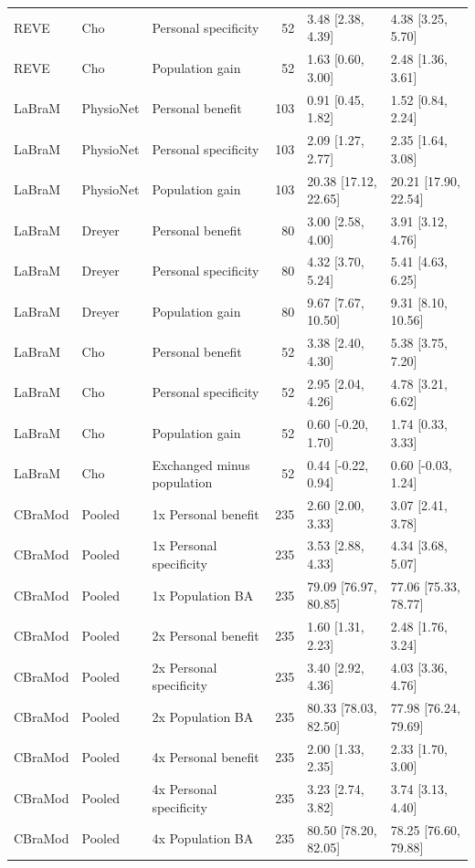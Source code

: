\begin{longtable}{p{.65in}p{.60in}p{1.9in}rp{1.20in}p{1.20in}}
REVE & Cho & Personal specificity & 52 & 3.48 [2.38, 4.39] & 4.38 [3.25, 5.70] \\
REVE & Cho & Population gain & 52 & 1.63 [0.60, 3.00] & 2.48 [1.36, 3.61] \\
LaBraM & PhysioNet & Personal benefit & 103 & 0.91 [0.45, 1.82] & 1.52 [0.84, 2.24] \\
LaBraM & PhysioNet & Personal specificity & 103 & 2.09 [1.27, 2.77] & 2.35 [1.64, 3.08] \\
LaBraM & PhysioNet & Population gain & 103 & 20.38 [17.12, 22.65] & 20.21 [17.90, 22.54] \\
LaBraM & Dreyer & Personal benefit & 80 & 3.00 [2.58, 4.00] & 3.91 [3.12, 4.76] \\
LaBraM & Dreyer & Personal specificity & 80 & 4.32 [3.70, 5.24] & 5.41 [4.63, 6.25] \\
LaBraM & Dreyer & Population gain & 80 & 9.67 [7.67, 10.50] & 9.31 [8.10, 10.56] \\
LaBraM & Cho & Personal benefit & 52 & 3.38 [2.40, 4.30] & 5.38 [3.75, 7.20] \\
LaBraM & Cho & Personal specificity & 52 & 2.95 [2.04, 4.26] & 4.78 [3.21, 6.62] \\
LaBraM & Cho & Population gain & 52 & 0.60 [-0.20, 1.70] & 1.74 [0.33, 3.33] \\
LaBraM & Cho & Exchanged minus population & 52 & 0.44 [-0.22, 0.94] & 0.60 [-0.03, 1.24] \\
CBraMod & Pooled & 1x Personal benefit & 235 & 2.60 [2.00, 3.33] & 3.07 [2.41, 3.78] \\
CBraMod & Pooled & 1x Personal specificity & 235 & 3.53 [2.88, 4.33] & 4.34 [3.68, 5.07] \\
CBraMod & Pooled & 1x Population BA & 235 & 79.09 [76.97, 80.85] & 77.06 [75.33, 78.77] \\
CBraMod & Pooled & 2x Personal benefit & 235 & 1.60 [1.31, 2.23] & 2.48 [1.76, 3.24] \\
CBraMod & Pooled & 2x Personal specificity & 235 & 3.40 [2.92, 4.36] & 4.03 [3.36, 4.76] \\
CBraMod & Pooled & 2x Population BA & 235 & 80.33 [78.03, 82.50] & 77.98 [76.24, 79.69] \\
CBraMod & Pooled & 4x Personal benefit & 235 & 2.00 [1.33, 2.35] & 2.33 [1.70, 3.00] \\
CBraMod & Pooled & 4x Personal specificity & 235 & 3.23 [2.74, 3.82] & 3.74 [3.13, 4.40] \\
CBraMod & Pooled & 4x Population BA & 235 & 80.50 [78.20, 82.05] & 78.25 [76.60, 79.88] \\

\end{longtable}

